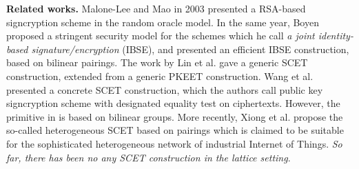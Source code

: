\documentclass[a4paper,11pt,onecolumn]{elsarticle}
\begin{document}
	
	\noindent \textbf{Related works.}  %
	Malone-Lee and Mao \cite{LM03} in 2003 presented a RSA-based signcryption scheme in the random oracle model. In the same year, Boyen \cite{Boy03} proposed a stringent security model for the schemes which he call \textit{a joint identity-based signature/encryption} (IBSE), and presented an  efficient IBSE construction, based on bilinear pairings.   The work \cite{LSQ18} by Lin et al. gave a generic SCET construction, extended from a generic PKEET construction.  Wang et al. \cite{WPD+19} presented a concrete SCET construction, which the authors call public key signcryption scheme with designated equality test on ciphertexts. However, the primitive in \cite{WPD+19} is based on bilinear groups. More recently, Xiong et al. \cite{XZH+20} propose the so-called  heterogeneous SCET based on pairings which is claimed to be suitable for the sophisticated heterogeneous network of industrial Internet of Things.  \textit{So far, there has been no any SCET construction in the lattice setting}.
	
\end{document}
